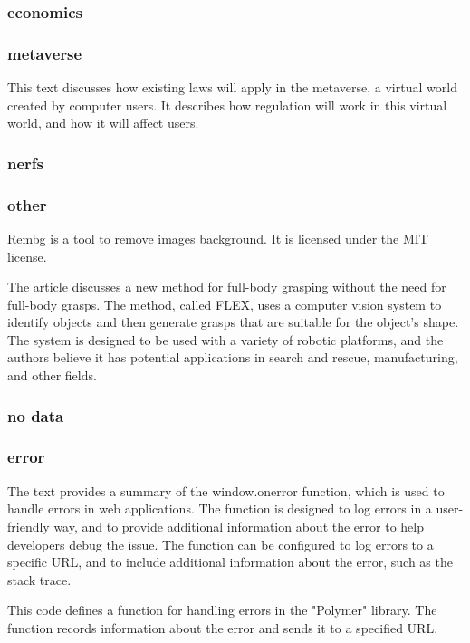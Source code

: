 \subsubsection{economics}
\subsubsection{metaverse}
This text discusses how existing laws will apply in the metaverse, a virtual world created by computer users. It describes how regulation will work in this virtual world, and how it will affect users.

\subsubsection{nerfs}
\subsubsection{other}
Rembg is a tool to remove images background. It is licensed under the MIT license.

The article discusses a new method for full-body grasping without the need for full-body grasps. The method, called FLEX, uses a computer vision system to identify objects and then generate grasps that are suitable for the object's shape. The system is designed to be used with a variety of robotic platforms, and the authors believe it has potential applications in search and rescue, manufacturing, and other fields.

\subsubsection{no data}
\subsubsection{error}
The text provides a summary of the window.onerror function, which is used to handle errors in web applications. The function is designed to log errors in a user-friendly way, and to provide additional information about the error to help developers debug the issue. The function can be configured to log errors to a specific URL, and to include additional information about the error, such as the stack trace.

This code defines a function for handling errors in the "Polymer" library. The function records information about the error and sends it to a specified URL.

